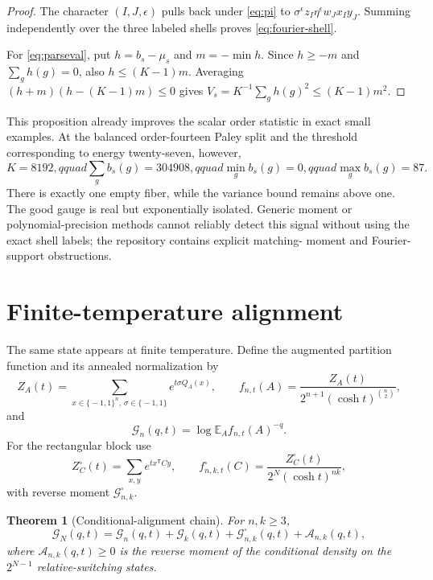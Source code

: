 \documentclass[11pt]{article}
\newcommand{\eps}{\{\!-1,1\!\}}
\newcommand{\E}{\mathbb E}
\newcommand{\T}{\mathsf T}
\newcommand{\cG}{\mathcal G}
\newcommand{\cA}{\mathcal A}
\newtheorem{theorem}{Theorem}[section]
\theoremstyle{definition}
\theoremstyle{remark}
\begin{document}
\begin{proof}
The character $(I,J,\epsilon)$ pulls back under \eqref{eq:pi} to
$\sigma^\epsilon z_I\eta^\epsilon w_Jx_Iy_J$.  Summing independently over
the three labeled shells proves \eqref{eq:fourier-shell}.

For \eqref{eq:parseval}, put $h=b_s-\mu_s$ and
$m=-\min h$.  Since $h\ge-m$ and $\sum_gh(g)=0$, also
$h\le(K-1)m$.  Averaging
$(h+m)(h-(K-1)m)\le0$ gives
$V_s=K^{-1}\sum_gh(g)^2\le(K-1)m^2$.
\end{proof}

This proposition already improves the scalar order statistic in exact small
examples.  At the balanced order-fourteen Paley split and the threshold
corresponding to energy twenty-seven, however,
\[
 K=8192,qquad \sum_gb_s(g)=304908,qquad
 \min_gb_s(g)=0,qquad\max_gb_s(g)=87.
\]
There is exactly one empty fiber, while the variance bound remains above one.
The good gauge is real but exponentially isolated.  Generic moment or
polynomial-precision methods cannot reliably detect this signal without
using the exact shell labels; the repository contains explicit matching-
moment and Fourier-support obstructions.

\section{Finite-temperature alignment}

The same state appears at finite temperature.  Define the augmented partition
function and its annealed normalization by
\[
 Z_A(t)=\sum_{x\in\eps^n,\,\sigma\in\eps}e^{t\sigma Q_A(x)},
 \qquad
 f_{n,t}(A)=\frac{Z_A(t)}{2^{n+1}(\cosh t)^{\binom n2}},
\]
and
\[
 \cG_n(q,t)=\log\E_Af_{n,t}(A)^{-q}.
\]
For the rectangular block use
\[
 Z_C^\square(t)=\sum_{x,y}e^{t x^{\T}Cy},\qquad
 f_{n,k,t}^\square(C)=
 \frac{Z_C^\square(t)}{2^N(\cosh t)^{nk}},
\]
with reverse moment $\cG_{n,k}^\square$.

\begin{theorem}[Conditional-alignment chain]
For $n,k\ge3$,
\begin{equation}
 \cG_N(q,t)=\cG_n(q,t)+\cG_k(q,t)
 +\cG_{n,k}^\square(q,t)+\cA_{n,k}(q,t),               \label{eq:alignment-chain}
\end{equation}
where $\cA_{n,k}(q,t)\ge0$ is the reverse moment of the conditional density
on the $2^{N-1}$ relative-switching states.
\end{theorem}
\end{document}

